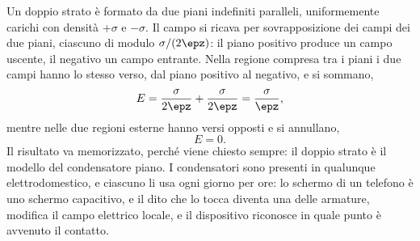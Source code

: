 \documentclass[main.tex]{subfiles}
\begin{document}
Un doppio strato è formato da due piani indefiniti paralleli, uniformemente carichi con densità $+\sigma$ e $-\sigma$. Il campo si ricava per sovrapposizione dei campi dei due piani, ciascuno di modulo $\sigma/(2\epz)$: il piano positivo produce un campo uscente, il negativo un campo entrante. Nella regione compresa tra i piani i due campi hanno lo stesso verso, dal piano positivo al negativo, e si sommano,
\[
E=\frac{\sigma}{2\epz}+\frac{\sigma}{2\epz}=\frac{\sigma}{\epz},
\]
mentre nelle due regioni esterne hanno versi opposti e si annullano,
\[
E=0 .
\]
Il risultato va memorizzato, perché viene chiesto sempre: il doppio strato è il modello del condensatore piano. I condensatori sono presenti in qualunque elettrodomestico, e ciascuno li usa ogni giorno per ore: lo schermo di un telefono è uno schermo capacitivo, e il dito che lo tocca diventa una delle armature, modifica il campo elettrico locale, e il dispositivo riconosce in quale punto è avvenuto il contatto.
\end{document}
